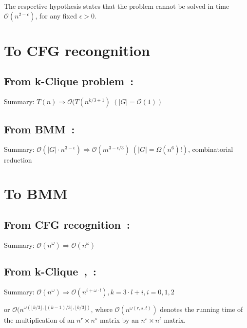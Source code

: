 \documentclass{amsart}
\begin{document}
	The respective hypothesis states that the problem cannot be solved in time $\mathcal{O}(n^{2 - \epsilon})$, for any fixed $\epsilon > 0$.
	
	\section{To CFG recongnition}
	
	\subsection{From k-Clique problem~\cite{abboud2018if}:\\}
	\label{cfg_to_clique}
	
	Summary: $T(n) \Rightarrow \mathcal{O}(T(n^{k/3+1}) \; (|G|=\mathcal{O}(1))$
	
	\subsection{From BMM~\cite{10.1145/505241.505242}:\\}
	\label{cfg_to_bmm}
	
	Summary: $\mathcal{O}(|G| \cdot n^{3 - \epsilon}) \Rightarrow \mathcal{O}(m^{3 - \epsilon/3}) \; (|G|=\Omega(n^6)!)$, combinatorial reduction
	
	\section{To BMM}
	
	\subsection{From CFG recognition~\cite{valiant1975general}:\\}
	\label{bmm_to_cfg}
	
	Summary: $\mathcal{O}(n^{\omega}) \Rightarrow \mathcal{O}(n^{\omega})$
	
	\subsection{From k-Clique~\cite{nevsetvril1985complexity},~\cite{10.1016/j.tcs.2004.05.009}:\\}
	\label{bmm_to_clique}
	
	Summary: $\mathcal{O}(n^{\omega}) \Rightarrow \mathcal{O}(n^{i + \omega \cdot l}), k = 3 \cdot l + i, i = 0, 1, 2$ 
	
	or $\mathcal{O}(n^{\omega(\lfloor k / 3 \rfloor, \lfloor (k - 1) / 3 \rfloor, \lfloor k / 3 \rfloor)}$, where $\mathcal{O}(n^{\omega(r, s, t)})$ denotes the running time of the multiplication of an $n^r \times n^s$ matrix by an $n^s \times n^t$ matrix.
	
\end{document}
